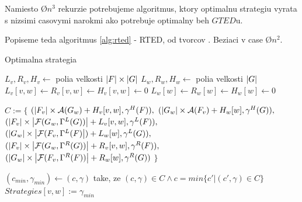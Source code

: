 Namiesto \O{$n^3$} rekurzie potrebujeme algoritmus, ktory optimalnu strategiu vyrata
s nizsimi casovymi narokmi ako potrebuje optimalny beh $GTED$u.

Popiseme teda algoritmus \ref{alg:rted} - RTED, od tvorcov \citet{RTED}.
Beziaci v case \O{$n^2$}.

\begin{algorithm}
  \caption{Optimalna strategia}
  \label{alg:rted}
  \begin{algorithmic}[1]
      \State $L_{v}, R_{v}, H_{v} \gets$ polia velkosti $\left|{F}\right| \times \left|{G}\right|$
      \State $L_{w}, R_{w}, H_{w} \gets$ polia velkosti $\left|{G}\right|$
            \State $L_{v}[v, w] \gets R_{v}[v, w] \gets H_{v}[v, w] \gets 0$
          \EndIf
            \State $L_{w}[w] \gets R_{w}[w] \gets  H_{w}[w] \gets 0$
          \EndIf

          \State $C := \{$
            \Indent
              \State $(\left|{F_{v}}\right| \times \mathcal{A}(G_{w}) +
                H_{v}[v, w], \gamma^{H}(F)),$
              \State $(\left|{G_{w}}\right| \times \mathcal{A}(F_{v}) +
                H_{w}[w], \gamma^{H}(G)),$
              \State $(\left|{F_{v}}\right| \times
                \left|{\mathcal{F}(G_{w}, \Gamma^{L}(G))}\right| +
                L_{v}[v, w], \gamma^{L}(F)),$
              \State $(\left|{G_{w}}\right| \times
                \left|{\mathcal{F}(F_{v}, \Gamma^{L}(F)}\right|) +
                L_{w}[w], \gamma^{L}(G)),$
              \State $(\left|{F_{v}}\right| \times
                \left|{\mathcal{F}(G_{w}, \Gamma^{R}(G))}\right| +
                R_{v}[v, w], \gamma^{R}(F)),$
              \State $(\left|{G_{w}}\right| \times
                \left|{\mathcal{F}(F_{v}, \Gamma^{R}(F))}\right| +
                R_{w}[w], \gamma^{R}(G))$
              \State $\}$
            \EndIndent

            \State $(c_{min}, \gamma_{min}) \gets (c, \gamma)$ take, ze
              $(c, \gamma) \in C \wedge c = min\{c' | (c', \gamma) \in C\}$
            \State $Strategies[v, w] := \gamma_{min}$

            \State {}
              \State {}
              \State {}
            \EndIf
              \State {}
              \State {}
              \State {}
            \EndIf
        \EndFor
      \EndFor
      \State {}
    \EndProcedure


\end{algorithmic}
\end{algorithm}
